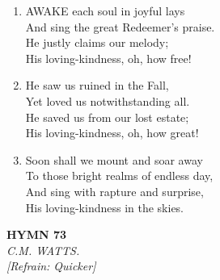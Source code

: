\begin{enumerate}
    \item AWAKE each soul in joyful lays \\
        And sing the great Redeemer's praise. \\
        He justly claims our melody; \\
        His loving-kindness, oh, how free!

    \item He saw us ruined in the Fall, \\
        Yet loved us notwithstanding all. \\
        He saved us from our lost estate; \\
        His loving-kindness, oh, how great!

    \item Soon shall we mount and soar away \\
        To those bright realms of endless day, \\
        And sing with rapture and surprise, \\
        His loving-kindness in the skies.

\end{enumerate}

\newpage
\begin{center}
    {\Large \textbf{HYMN 73}}
    \\
    \textit{C.M. WATTS.}
    \\
    \textit{\small [Refrain: Quicker]}
\end{center}
\vspace{1em}


